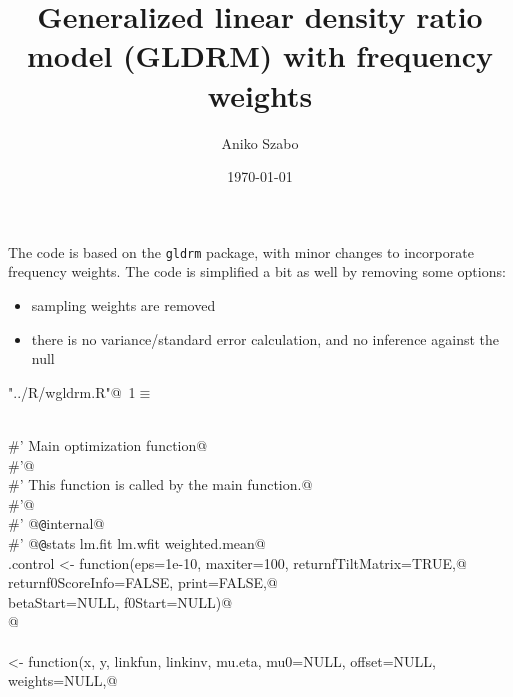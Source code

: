 \documentclass[reqno]{amsart}
\title{Generalized linear density ratio model (GLDRM) with frequency weights}
\author{Aniko Szabo}
\date{\today}
\renewcommand{\NWtarget}[2]{\hypertarget{#1}{#2}}
\begin{document}
\maketitle

The code is based on the \texttt{gldrm} package, with minor changes to incorporate frequency weights. The code is simplified a bit as well by removing some options:
\begin{itemize}
  \item sampling weights are removed
  \item there is no variance/standard error calculation, and no inference against the null
\end{itemize}


\begin{flushleft} \small\label{scrap1}\raggedright\small
\NWtarget{nuweb1}{} \verb@"../R/wgldrm.R"@\nobreak\ {\footnotesize {1}}$\equiv$
\vspace{-1ex}
\begin{list}{}{} \item
\mbox{}\verb@@\\
\mbox{}\verb@#' Main optimization function@\\
\mbox{}\verb@#'@\\
\mbox{}\verb@#' This function is called by the main  function.@\\
\mbox{}\verb@#'@\\
\mbox{}\verb@#' @{\tt @}\verb@keywords internal@\\
\mbox{}\verb@#' @{\tt @}\verb@importFrom stats lm.fit lm.wfit weighted.mean@\\
\mbox{}\verb@gldrm.control <- function(eps=1e-10, maxiter=100, returnfTiltMatrix=TRUE,@\\
\mbox{}\verb@                          returnf0ScoreInfo=FALSE, print=FALSE,@\\
\mbox{}\verb@                          betaStart=NULL, f0Start=NULL)@\\
\mbox{}@\\
\mbox{}\verb@@\\
\mbox{}\verb@gldrmFit <- function(x, y, linkfun, linkinv, mu.eta, mu0=NULL, offset=NULL, weights=NULL,@\\

\end{list}
\end{flushleft}
\end{document}
